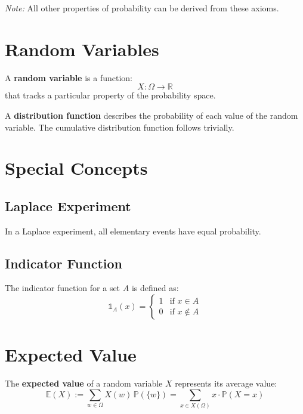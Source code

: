 \documentclass{article}
\begin{document}
\noindent
\textit{Note:} All other properties of probability can be derived from these axioms.

\section{Random Variables}

A \textbf{random variable} is a function:
\[
    X : \Omega \to \mathbb{R}
\]
that tracks a particular property of the probability space.

\medskip
\noindent
A \textbf{distribution function} describes the probability of each value of the random variable. The cumulative distribution function follows trivially.

\section{Special Concepts}

\subsection{Laplace Experiment}
In a Laplace experiment, all elementary events have equal probability.

\subsection{Indicator Function}
The indicator function for a set $A$ is defined as:
\[
    \mathbb{1}_A(x) = 
    \begin{cases}
        1 & \text{if } x \in A \\
        0 & \text{if } x \notin A
    \end{cases}
\]

\section{Expected Value}

The \textbf{expected value} of a random variable $X$ represents its average value:
\[
    \mathbb{E}(X) := \sum_{w \in \Omega} X(w) \, \mathbb{P}(\{w\}) 
    = \sum_{x \in X(\Omega)} x \cdot \mathbb{P}(X = x)
\]
\end{document}
